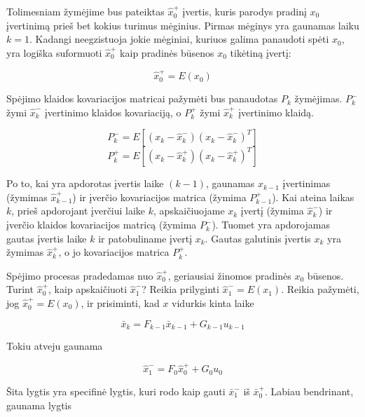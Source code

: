     Tolimesniam žymėjime bus pateiktas $\hat{x}_0^+$ įvertis, kuris parodys pradinį $x_0$ įvertinimą prieš bet kokius turimus mėginius.
    Pirmas mėginys yra gaunamas laiku $k=1$.
    Kadangi neegzistuoja jokie mėginiai, kuriuos galima panaudoti spėti $x_0$, yra logiška suformuoti $\hat{x}^+_0$ kaip pradinės būsenos $x_0$ tikėtiną įvertį:

    \begin{equation}
        \hat{x}_0^+ = E(x_0)
    \end{equation}

    Spėjimo klaidos kovariacijos matricai pažymėti bus panaudotas $P_k$ žymėjimas.
    $P_k^-$ žymi $\hat{x}_k^-$ įvertinimo klaidos kovariaciją, o $P_k^+$ žymi $\hat{x}_k^+$ įvertinimo klaidą.

    \begin{equation}
        P_k^- = E[(x_k - \hat{x}_k^-)(x_k - \hat{x}_k^-)^T]
    \end{equation}
    \begin{equation}
        P_k^+ = E[(x_k - \hat{x}_k^+)(x_k-\hat{x}_k^+)^T]
    \end{equation}

    Po to, kai yra apdorotas įvertis laike $(k-1)$, gaunamas $x_{k-1}$ įvertinimas (žymimas $\hat{x}_{k-1}^+$) ir įverčio kovariacijos matrica (žymima $P_{k-1}^+$).
    Kai ateina laikas $k$, prieš apdorojant įverčiui laike $k$, apskaičiuojame $x_k$ įvertį (žymima $\hat{x}_k^-$) ir įverčio klaidos kovariacijos matricą (žymima $P_k^-$).
    Tuomet yra apdorojamas gautas įvertis laike $k$ ir patobuliname įvertį $x_k$.
    Gautas galutinis įvertis $x_k$ yra žymimas $\hat{x}_k^+$, o jo kovariacijos matrica $P_k^+$.

    Spėjimo procesas pradedamas nuo $\hat{x}_0^+$, geriausiai žinomos pradinės $x_0$ būsenos.
    Turint $\hat{x}_0^+$, kaip apskaičiuoti $\hat{x}_1^-$?
    Reikia prilyginti $\hat{x}_1^- = E(x_1)$.
    Reikia pažymėti, jog $\hat{x}_0^+ = E(x_0)$, ir prisiminti, kad $x$ vidurkis kinta laike

    \begin{equation}
        \bar{x}_k = F_{k-1}\bar{x}_{k-1} + G_{k-1}u_{k-1}
    \end{equation}

    Tokiu atveju gaunama

    \begin{equation}
        \hat{x}_1^- = F_0\hat{x}_0^+ + G_0u_0
    \end{equation}

    Šita lygtis yra specifinė lygtis, kuri rodo kaip gauti $\bar{x}_1^-$ iš $\bar{x}_0^+$. Labiau bendrinant, gaunama lygtis

